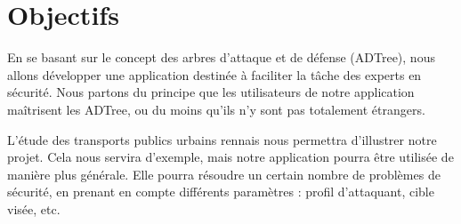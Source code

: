 \section{Objectifs}
	\label{sec:objectifs}

En se basant sur le concept des arbres d’attaque et de défense (ADTree), nous allons développer une application destinée à faciliter la tâche des experts en sécurité. Nous partons du principe que les utilisateurs de notre application maîtrisent les ADTree, ou du moins qu’ils n’y sont pas totalement étrangers.

L’étude des transports publics urbains rennais nous permettra d’illustrer notre projet. Cela nous servira d’exemple, mais notre application pourra être utilisée de manière plus générale. Elle pourra résoudre un certain nombre de problèmes de sécurité, en prenant en compte différents paramètres : profil d’attaquant, cible visée, etc. 




